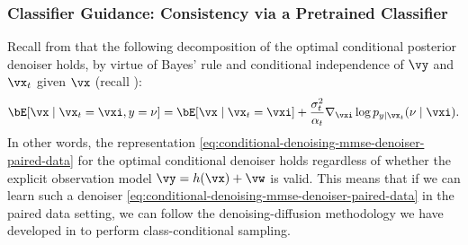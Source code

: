 \documentclass[../../book-main.tex]{subfiles}
\begin{document}
\subsubsection{Classifier Guidance: Consistency via a Pretrained Classifier}

Recall from 
that the following decomposition of the optimal conditional posterior denoiser
holds,
by virtue of Bayes' rule
and conditional independence of $\vy$ and $\vx_t$ given $\vx$ (recall
):
\begin{equation}\label{eq:conditional-denoising-mmse-denoiser-paired-data}
    \bE[ \vx \mid \vx_t=\vxi, y=\nu]
    =
    \bE[\vx \mid \vx_t=\vxi]
    + \frac{\sigma_t^2}{\alpha_t}
    \nabla_{\vxi}\log p_{y \mid \vx_t}(\nu\mid \vxi).
\end{equation}
In other words, the representation
\eqref{eq:conditional-denoising-mmse-denoiser-paired-data}
for the optimal conditional denoiser holds regardless of whether the explicit
observation model $\vy = h(\vx) + \vw$ is valid.
This means that if we can learn such a denoiser
\eqref{eq:conditional-denoising-mmse-denoiser-paired-data} in the paired data
setting, we can follow the denoising-diffusion methodology we have developed in
 to perform class-conditional sampling.
\end{document}

